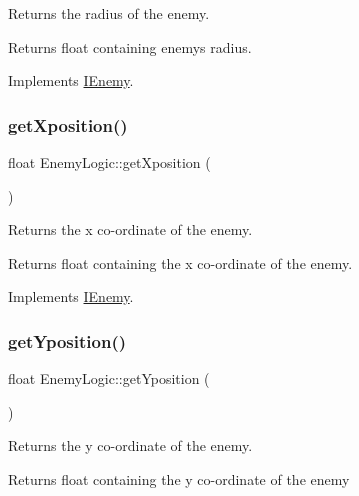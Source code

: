 Returns the radius of the enemy. 

\begin{DoxyReturn}{Returns}
float containing enemy\textquotesingle{}s radius. 
\end{DoxyReturn}


Implements \hyperlink{class_i_enemy}{I\+Enemy}.

\mbox{\label{class_enemy_logic_a7eed969ab8e3d2527cdac04ef39a5aba}} 
\subsubsection{\texorpdfstring{get\+Xposition()}{getXposition()}}
{\footnotesize\ttfamily float Enemy\+Logic\+::get\+Xposition (\begin{DoxyParamCaption}{ }\end{DoxyParamCaption})\hspace{0.3cm}{\ttfamily [virtual]}}



Returns the x co-\/ordinate of the enemy. 

\begin{DoxyReturn}{Returns}
float containing the x co-\/ordinate of the enemy. 
\end{DoxyReturn}


Implements \hyperlink{class_i_enemy}{I\+Enemy}.

\mbox{\label{class_enemy_logic_ae614032054926a4a25ed56f61111392b}} 
\subsubsection{\texorpdfstring{get\+Yposition()}{getYposition()}}
{\footnotesize\ttfamily float Enemy\+Logic\+::get\+Yposition (\begin{DoxyParamCaption}{ }\end{DoxyParamCaption})\hspace{0.3cm}{\ttfamily [virtual]}}



Returns the y co-\/ordinate of the enemy. 

\begin{DoxyReturn}{Returns}
float containing the y co-\/ordinate of the enemy 
\end{DoxyReturn}


